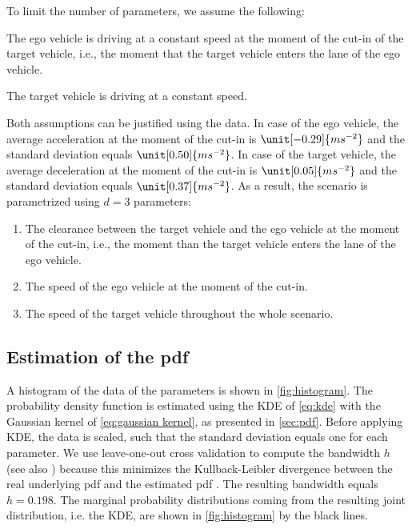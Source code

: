 To limit the number of parameters, we assume the following:
\begin{assumption}
	The ego vehicle is driving at a constant speed at the moment of the cut-in of the target vehicle, i.e., the moment that the target vehicle enters the lane of the ego vehicle.
\end{assumption}
\begin{assumption}
	The target vehicle is driving at a constant speed.
\end{assumption}
Both assumptions can be justified using the data. In case of the ego vehicle, the average acceleration at the moment of the cut-in is $\unit[-0.29]{ms^{-2}}$ and the standard deviation equals $\unit[0.50]{ms^{-2}}$. In case of the target vehicle, the average deceleration at the moment of the cut-in is $\unit[0.05]{ms^{-2}}$ and the standard deviation equals $\unit[0.37]{ms^{-2}}$. As a result, the scenario is parametrized using $d=3$ parameters:
\begin{enumerate}
	\item The clearance between the target vehicle and the ego vehicle at the moment of the cut-in, i.e., the moment than the target vehicle enters the lane of the ego vehicle.
	\item The speed of the ego vehicle at the moment of the cut-in.
	\item The speed of the target vehicle throughout the whole scenario.
\end{enumerate}



\subsection{Estimation of the pdf}
\label{sec:example pdf}

A histogram of the data of the parameters is shown in \cref{fig:histogram}. The probability density function is estimated using the KDE of \cref{eq:kde} with the Gaussian kernel of \cref{eq:gaussian kernel}, as presented in \cref{sec:pdf}. Before applying KDE, the data is scaled, such that the standard deviation equals one for each parameter. We use leave-one-out cross validation to compute the bandwidth $h$ (see also \cite{duin1976parzen}) because this minimizes the Kullback-Leibler divergence between the real underlying pdf and the estimated pdf \cite{turlach1993bandwidthselection,zambom2013review}. The resulting bandwidth equals $h=0.198$. The marginal probability distributions coming from the resulting joint distribution, i.e. the KDE, are shown in \cref{fig:histogram} by the black lines.

